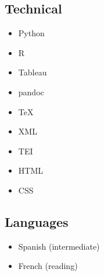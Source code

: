 \documentclass[
  12pt,
  letterpaper,
]{article}
\providecommand{\tightlist}{%
  \setlength{\itemsep}{0pt}\setlength{\parskip}{0pt}}
\begin{document}
\hypertarget{technical}{%
\subsection{Technical}\label{technical}}

\begin{itemize}
\tightlist
\item
  Python
\item
  R
\item
  Tableau
\item
  pandoc
\item
  TeX
\item
  XML
\item
  TEI
\item
  HTML
\item
  CSS
\end{itemize}

\hypertarget{languages}{%
\subsection{Languages}\label{languages}}

\begin{itemize}
\tightlist
\item
Spanish (intermediate)
\item
French (reading)
\end{itemize}
\end{document}
